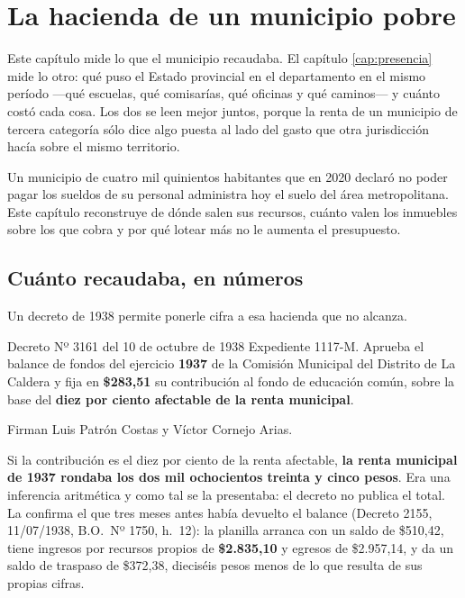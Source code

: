 \chapter{La hacienda de un municipio pobre}

\begin{cautela}
Este capítulo mide lo que el municipio recaudaba. El capítulo \ref{cap:presencia} mide lo otro: qué puso el Estado provincial en el departamento en el mismo período ---qué escuelas, qué comisarías, qué oficinas y qué caminos--- y cuánto costó cada cosa. Los dos se leen mejor juntos, porque la renta de un municipio de tercera categoría sólo dice algo puesta al lado del gasto que otra jurisdicción hacía sobre el mismo territorio.
\end{cautela}


\label{cap:hacienda}

Un municipio de cuatro mil quinientos habitantes que en 2020 declaró no poder pagar los
sueldos de su personal administra hoy el suelo del área metropolitana. Este capítulo
reconstruye de dónde salen sus recursos, cuánto valen los inmuebles sobre los que cobra y
por qué lotear más no le aumenta el presupuesto.

\section{Cuánto recaudaba, en números}

Un decreto de 1938 permite ponerle cifra a esa hacienda que no alcanza.

\begin{ficha}{Decreto Nº 3161 del 10 de octubre de 1938}
Expediente 1117-M. Aprueba el balance de fondos del ejercicio \textbf{1937} de la Comisión
Municipal del Distrito de La Caldera y fija en \textbf{\$283,51} su contribución al fondo de
educación común, sobre la base del \textbf{diez por ciento afectable de la renta municipal}.

Firman Luis Patrón Costas y Víctor Cornejo Arias.
\end{ficha}

Si la contribución es el diez por ciento de la renta afectable, \textbf{la renta municipal de
1937 rondaba los dos mil ochocientos treinta y cinco pesos}. Era una inferencia aritmética y
como tal se la presentaba: el decreto no publica el total. La confirma el que tres meses antes había devuelto el balance (Decreto 2155, 11/07/1938, B.O.\ Nº 1750, h.\ 12): la planilla arranca con un saldo de \$510,42, tiene ingresos por recursos propios de \textbf{\$2.835,10} y egresos de \$2.957,14, y da un saldo de traspaso de \$372,38, dieciséis pesos menos de lo que resulta de sus propias cifras.

